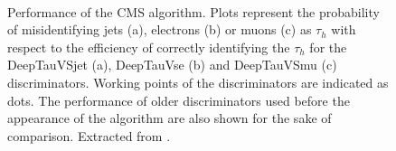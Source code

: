 \documentclass[../main.tex]{subfiles}
\begin{document}
\begin{figure}[h!]
\begin{center}
 \\
\end{center}
\caption[Performance of the CMS \deeptau{} algorithm]{Performance of the CMS \deeptau{} algorithm. Plots represent the probability of misidentifying jets (a), electrons (b) or muons (c) as $\tau_h$ with respect to the efficiency of correctly identifying the $\tau_h$ for the DeepTauVSjet (a), DeepTauVse (b) and DeepTauVSmu (c) discriminators. Working points of the discriminators are indicated as dots. The performance of older discriminators used before the appearance of the \deeptau{} algorithm are also shown for the sake of comparison. Extracted from \cite{intro:id:deeptau}.}
\label{intro:fig:deeptau}
\end{figure}
\end{document}
